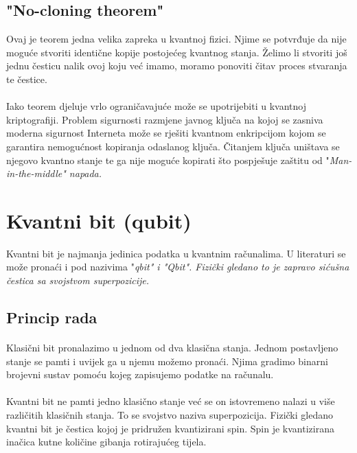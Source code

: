 \documentclass[times, utf8, zavrsni, numeric]{fer}
\begin{document}
\subsection{"No-cloning theorem"}
Ovaj je teorem jedna velika zapreka u kvantnoj fizici. 
Njime se potvrđuje da nije moguće stvoriti identične kopije postojećeg kvantnog stanja. Želimo li stvoriti još jednu česticu nalik ovoj koju već imamo, moramo ponoviti čitav proces stvaranja te čestice. \cite{q_history}

\paragraph{}
Iako teorem djeluje vrlo ograničavajuće može se upotrijebiti u kvantnoj kriptografiji. Problem sigurnosti razmjene javnog ključa na kojoj se zasniva moderna sigurnost Interneta može se rješiti kvantnom enkripcijom kojom se garantira nemogućnost kopiranja odaslanog ključa. Čitanjem ključa uništava se njegovo kvantno stanje te ga nije moguće kopirati što pospješuje zaštitu od "\it Man-in-the-middle\rm" napada. \citep{han_phd}

\section{Kvantni bit (qubit)}
Kvantni bit je najmanja jedinica podatka u kvantnim računalima. U literaturi se može pronaći i pod nazivima "\it qbit\rm" i "\it Qbit\rm". Fizički gledano to je zapravo sićušna čestica sa svojstvom superpozicije.

\subsection{Princip rada}
\paragraph{}
Klasični bit pronalazimo u jednom od dva klasična stanja. Jednom postavljeno stanje se pamti i uvijek ga u njemu možemo pronaći. Njima gradimo binarni brojevni sustav pomoću kojeg zapisujemo podatke na računalu.

\paragraph{}
Kvantni bit ne pamti jedno klasično stanje već se on istovremeno nalazi u više različitih klasičnih stanja. To se svojstvo naziva superpozicija. Fizički gledano kvantni bit je čestica kojoj je pridružen kvantizirani spin. Spin je kvantizirana inačica kutne količine gibanja rotirajućeg tijela.
\end{document}
